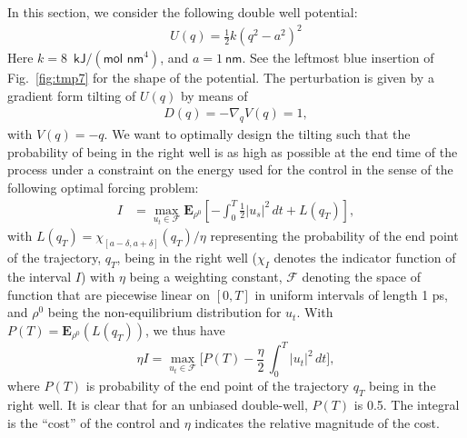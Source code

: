 \documentclass[]{tMPH2e}
\newcommand{\bE}{{\mathbf E}}
\begin{document}
In this section, we consider the following double well potential:
\begin{align}
  U( q) = \frac12 k ( q^2 - a^2)^2
\end{align}
Here $k = 8$~$\textsf{kJ} / (\textsf{mol nm}^4)$, and $ a = 1\
\textsf{nm}$.  See the leftmost blue insertion of Fig.~\ref{fig:tmp7} for
the shape of the potential.
The perturbation is given by a gradient form tilting of $U( q)$ by means of
\begin{align}
   D( q) = -\nabla_{ q} V( q) = 1,
\end{align}
with $V( q) = - q$. We want to
optimally design the tilting such that the probability
of being in the right well is as high as possible 
at the end time of the process under a constraint on the energy used for the control in the sense of
the following optimal forcing problem:
\begin{align}
  I & = \max_{u_t \in\mathcal F} \bE_{\rho^0}\left[ -\int_{0}^{T} \frac{1}{2}|u_{s}|^{2}\,dt + L(q_T) \right],
\end{align}
with $L(q_T)=\chi_{[a-\delta,a+\delta]}(q_T)/\eta$ representing the probability of the end point of the trajectory, $ q_T$, being in the right well ($\chi_I$ denotes the indicator function of the interval $I$) with $\eta$ being a weighting constant, ${\mathcal F}$ denoting the space of function that are piecewise linear  on $[0, T]$ in uniform intervals of length 1 ps, and $\rho^0$ being the non-equilibrium distribution for $u_t$. With $P(T) =  \bE_{\rho^0}(L(q_T))$, we thus have
\[
  \eta I = \max_{u_t \in\mathcal F} \Big[ P(T) -
  \frac{\eta}{2}\,
   \int_0^T |u_t|^2\, dt\Big],
\]
where $P(T)$ is probability of the end point of the trajectory
$ q_T$ being in the right well.  It is
clear that for an unbiased double-well, $P(T)$
is 0.5.  The integral is the ``cost'' of the control and $\eta$  indicates the relative magnitude of the
cost. 
\end{document}
